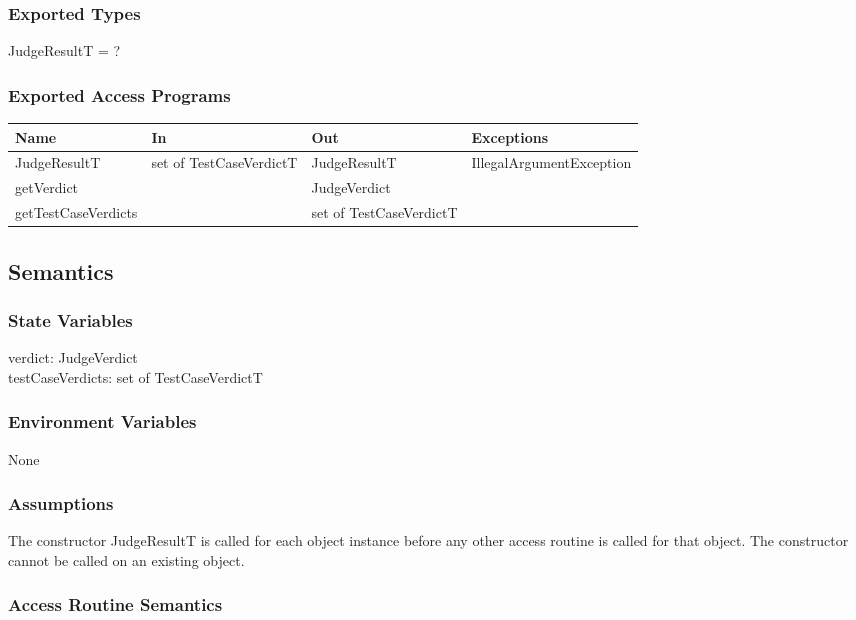 \documentclass[12pt, titlepage]{article}
\begin{document}
\subsubsection{Exported Types}

JudgeResultT = ?

\subsubsection{Exported Access Programs}

\begin{center}
\begin{tabular}{ |  p{4cm} | p{5cm} |  p{3cm} | p{5cm} | }
\hline
\textbf{Name} & \textbf{In} & \textbf{Out} & \textbf{Exceptions} \\
\hline
JudgeResultT & set of TestCaseVerdictT & JudgeResultT &  IllegalArgumentException \\
getVerdict &   & JudgeVerdict &  \\
getTestCaseVerdicts &   & set of TestCaseVerdictT &  \\
\hline
\end{tabular}
\end{center}

\subsection{Semantics}

\subsubsection{State Variables}

verdict: JudgeVerdict\\
testCaseVerdicts: set of TestCaseVerdictT

\subsubsection{Environment Variables}

None

\subsubsection{Assumptions}

The constructor JudgeResultT is called for each object instance before any other access routine is called for that object. The constructor cannot be called on an existing object.

\subsubsection{Access Routine Semantics}
\end{document}
